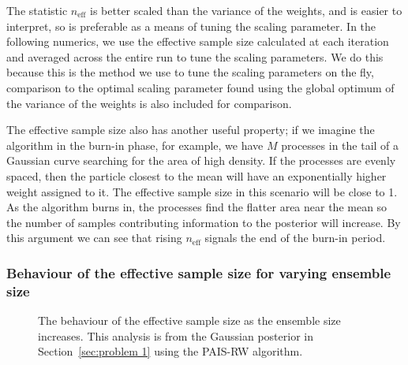\documentclass[final]{siamltex}
\newcommand{\neff}{n_{\text{eff}}}
\begin{document}
The statistic $\neff$ is better scaled than the variance of the weights, and is easier to interpret, so is preferable as a means of tuning the scaling parameter. In the following numerics, we use the effective sample size calculated at each iteration and averaged across the entire run to tune the scaling parameters. We do this because this is the method we use to tune the scaling parameters on the fly, comparison to the optimal scaling parameter found using the global optimum of the variance of the weights is also included for comparison.

The effective sample size also has another useful property; if we imagine the algorithm in the burn-in phase, for example, we have $M$ processes in the tail of a Gaussian curve searching for the area of high density. If the processes are evenly spaced, then the particle closest to the mean will have an exponentially higher weight assigned to it. The effective sample size in this scenario will be close to 1. As the algorithm burns in, the processes find the flatter area near the mean so the number of samples contributing information to the posterior will increase. By this argument we can see that rising $\neff$ signals the end of the burn-in period.

\subsubsection{Behaviour of the effective sample size for varying ensemble size}

\begin{figure}[htb]
\centering
{}
\caption{The behaviour of the effective sample size as the ensemble size increases. This analysis is from the Gaussian posterior in Section~\ref{sec:problem 1} using the PAIS-RW algorithm.}
\label{fig:neff-M}
\end{figure}
\end{document}
